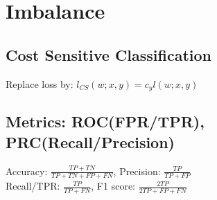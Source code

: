 \section*{Imbalance}
\subsection*{Cost Sensitive Classification}
Replace loss by: $l_{CS}(w;x,y) = c_y l(w;x,y)$

\subsection*{Metrics: ROC(FPR/TPR), PRC(Recall/Precision)}
Accuracy: $\frac{TP+TN}{TP+TN+FP+FN}$, Precision: $\frac{TP}{TP+FP}$\\ Recall/TPR: $\frac{TP}{TP+FN}$, F1 score: $\frac{2TP}{2TP+FP+FN}$